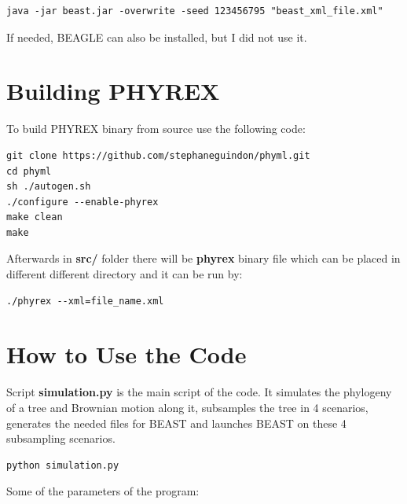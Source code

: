 \begin{verbatim}
java -jar beast.jar -overwrite -seed 123456795 "beast_xml_file.xml"
\end{verbatim}

If needed, BEAGLE can also be installed, but I did not use it.


\section*{Building PHYREX}
To build PHYREX binary from source use the following code:
\begin{verbatim}
git clone https://github.com/stephaneguindon/phyml.git
cd phyml
sh ./autogen.sh
./configure --enable-phyrex
make clean
make
\end{verbatim}

Afterwards in \textbf{src/} folder there will be \textbf{phyrex} binary file which can be placed in different different directory and it can be run by:

\begin{verbatim}
./phyrex --xml=file_name.xml
\end{verbatim}

\clearpage

\section*{How to Use the Code}






Script \textbf{simulation.py} is the main script of the code. It simulates the phylogeny of a tree and Brownian motion along it, subsamples the tree in 4 scenarios, generates the needed files for BEAST and launches BEAST on these 4 subsampling scenarios.

\begin{verbatim}
python simulation.py 
\end{verbatim}

Some of the parameters of the program:

